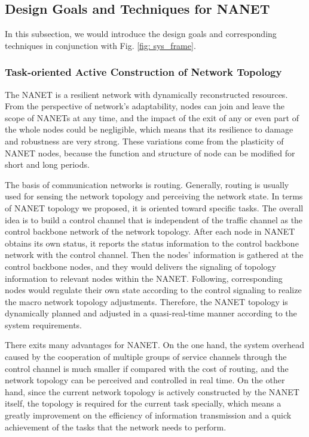 \documentclass[journal,comsoc]{IEEEtran}
\begin{document}
		\subsection{Design Goals and Techniques for NANET}
		\label{section: framework}	
			In this subsection, we would introduce the design goals and corresponding techniques in conjunction with Fig. \ref{fig: sys_frame}.
	
			\subsubsection{Task-oriented Active Construction of Network Topology}
				The NANET is a resilient network with dynamically reconstructed resources.
				From the perspective of network's adaptability, nodes can join and leave the scope of NANETs at any time, 
				and the impact of the exit of any or even part of the whole nodes could be negligible, which means that its resilience to damage and robustness are very strong.
				These variations come from the plasticity of NANET nodes, because the function and structure of node can be modified for short and long periods.
				
				The basis of communication networks is routing. 
				Generally, routing is usually used for sensing the network topology and perceiving the network state.
				In terms of NANET topology we proposed, it is oriented toward specific tasks.
				The overall idea is to build a control channel that is independent of the traffic channel as the control backbone network of the network topology.
				After each node in NANET obtains its own status, it reports the status information to the control backbone network with the control channel.
				Then the nodes' information is gathered at the control backbone nodes, and they would delivers the signaling of topology information to relevant nodes within the NANET.
				Following, corresponding nodes would regulate their own state according to the control signaling to realize the macro network topology adjustments.
				Therefore, the NANET topology is dynamically planned and adjusted in a quasi-real-time manner according to the system requirements.
				
				There exits many advantages for NANET.
				On the one hand, the system overhead caused by the cooperation of multiple groups of service channels through the control channel is much smaller if compared with the cost of routing, 
				and the network topology can be perceived and controlled in real time.
				On the other hand, since the current network topology is actively constructed by the NANET itself, the topology is required for the current task specially, 
				which means a greatly improvement on the efficiency of information transmission and a quick achievement of the tasks that the network needs to perform.
						
\end{document}
